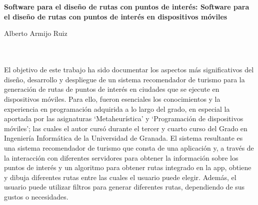 \chapter*{}




\cleardoublepage
\thispagestyle{empty}

\begin{center}
	{\large\bfseries Software para el diseño de rutas con 
		puntos de interés: Software para el diseño de rutas con 
		puntos de interés en dispositivos móviles}\\
\end{center}
\begin{center}
	Alberto Armijo Ruiz\\
\end{center}
\\

\vspace{0.7cm}
\\

El objetivo de este trabajo ha sido documentar los aspectos más significativos del diseño, desarrollo y despliegue de un sistema recomendador de turismo para la generación de rutas de puntos de interés en ciudades que se ejecute en dispositivos móviles.\newline
Para ello, fueron esenciales los conocimientos y la experiencia en programación adquirida a lo largo del grado, en especial la aportada por las asignaturas \enquote*{Metaheurística} y \enquote*{Programación de dispositivos móviles}; las cuales el autor cursó durante el tercer y cuarto curso del Grado en Ingeniería Informática de la Universidad de Granada. \newline
El sistema resultante es una sistema recomendador de turismo que consta de una aplicación y, a través de la interacción con diferentes servidores para obtener la información sobre los puntos de interés y un algoritmo para obtener rutas integrado en la app, obtiene y dibuja diferentes rutas entre las cuales el usuario puede elegir. Además, el usuario puede utilizar filtros para generar diferentes rutas, dependiendo de sus gustos o necesidades.

\cleardoublepage


\thispagestyle{empty}


